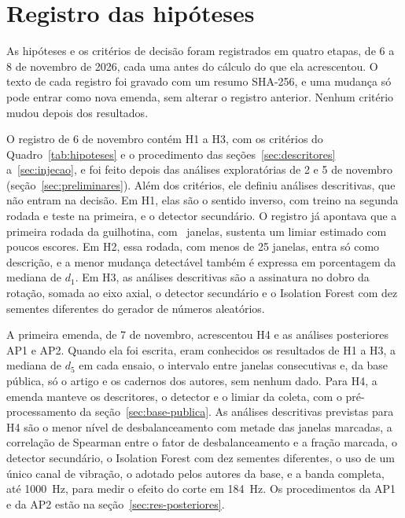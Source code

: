 \chapter{Registro das hipóteses}\label{ap:registro}

As hipóteses e os critérios de decisão foram registrados em quatro etapas, de 6 a 8 de novembro de 2026, cada uma antes do cálculo do que ela acrescentou. O texto de cada registro foi gravado com um resumo SHA-256, e uma mudança só pode entrar como nova emenda, sem alterar o registro anterior. Nenhum critério mudou depois dos resultados.

O registro de 6 de novembro contém H1 a H3, com os critérios do Quadro~\ref{tab:hipoteses} e o procedimento das seções~\ref{sec:descritores} a~\ref{sec:injecao}, e foi feito depois das análises exploratórias de 2 e 5 de novembro (seção~\ref{sec:preliminares}). Além dos critérios, ele definiu análises descritivas, que não entram na decisão. Em H1, elas são o sentido inverso, com treino na segunda rodada e teste na primeira, e o detector secundário. O registro já apontava que a primeira rodada da guilhotina, com \campoJanelasGuilhotinaUm\ janelas, sustenta um limiar estimado com poucos escores. Em H2, essa rodada, com menos de \num{25} janelas, entra só como descrição, e a menor mudança detectável também é expressa em porcentagem da mediana de $d_1$. Em H3, as análises descritivas são a assinatura no dobro da rotação, somada ao eixo axial, o detector secundário e o Isolation Forest com dez sementes diferentes do gerador de números aleatórios.

A primeira emenda, de 7 de novembro, acrescentou H4 e as análises posteriores AP1 e AP2. Quando ela foi escrita, eram conhecidos os resultados de H1 a H3, a mediana de $d_5$ em cada ensaio, o intervalo entre janelas consecutivas e, da base pública, só o artigo e os cadernos dos autores, sem nenhum dado. Para H4, a emenda manteve os descritores, o detector e o limiar da coleta, com o pré-processamento da seção~\ref{sec:base-publica}. As análises descritivas previstas para H4 são o menor nível de desbalanceamento com metade das janelas marcadas, a correlação de Spearman entre o fator de desbalanceamento e a fração marcada, o detector secundário, o Isolation Forest com dez sementes diferentes, o uso de um único canal de vibração, o adotado pelos autores da base, e a banda completa, até \SI{1000}{\hertz}, para medir o efeito do corte em \SI{184}{\hertz}. Os procedimentos da AP1 e da AP2 estão na seção~\ref{sec:res-posteriores}.

